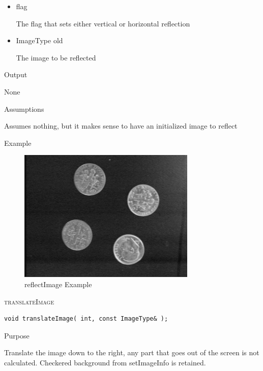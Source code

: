 \documentclass[pdftex, 11pt]{article}
\begin{document}
\begin{description}
\begin{description}
				\begin{itemize}

					\item{flag}

						The flag that sets either vertical or
						horizontal reflection

					\item{ImageType old}

						The image to be reflected

				\end{itemize}

			\item{Output}

				None

			\item{Assumptions}

				Assumes nothing, but it makes sense to have an initialized
				image to reflect

			\item{Example}

				\begin{figure}[ht!]
					\centering
					\caption{reflectImage Example}
				\includegraphics{images/outreflect.png}
			\end{figure}

		\end{description}


	\item{\textsc{translateImage}}
		\begin{description}

\begin{lstlisting}
void translateImage( int, const ImageType& );
\end{lstlisting}

			\item{Purpose}

				Translate the image down to the right,
				any part that goes out of the screen is
 				not calculated.  Checkered background from
				setImageInfo is retained.


\end{description}
\end{description}
\end{document}
